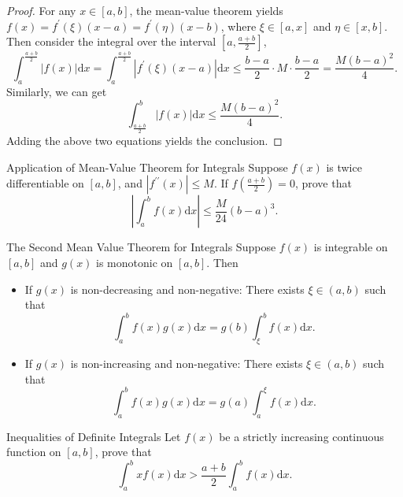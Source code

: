 \begin{proof}
  For any $x \in [a, b]$, the mean-value theorem yields $f(x) =
  f^{\prime}(\xi)(x - a) = f^{\prime}(\eta)(x - b)$,
  where $\xi \in [a, x]$ and $\eta \in [x, b]$.
  Then consider the integral over the interval $[a, \frac{a+b}{2}]$,
  \begin{equation}
    \int_a^{\frac{a+b}{2}} |f(x)| \mathrm{d} x
    = \int_a^{\frac{a+b}{2}} |f^{\prime}(\xi) (x - a)| \mathrm{d} x
    \leq \frac{b-a}{2} \cdot M \cdot \frac{b-a}{2} = \frac{M(b-a)^2}{4}.
  \end{equation}
  Similarly, we can get
  \begin{equation}
    \int_{\frac{a+b}{2}}^b |f(x)|\mathrm{d} x \leq \frac{M(b-a)^2}{4}.
  \end{equation}
  Adding the above two equations yields the conclusion.
\end{proof}

\begin{example}{Application of Mean-Value Theorem for Integrals}{}
  Suppose $f(x)$ is twice differentiable on $[a, b]$,
  and $|f^{\prime\prime}(x)| \leq M$.
  If $f(\frac{a+b}{2}) = 0$, prove that
  \begin{equation}
    \left| \int_a^b f(x)\mathrm{d} x \right| \leq \frac{M}{24}(b - a)^3.
  \end{equation}
\end{example}

\begin{theorem}{The Second Mean Value Theorem for Integrals}{}
  Suppose $f(x)$ is integrable on $[a, b]$ and $g(x)$ is monotonic on $[a, b]$.
  Then 
  \begin{itemize}
  \item If $g(x)$ is non-decreasing and non-negative: There exists $\xi \in (a,
    b)$ such that
    \begin{equation}
      \int_a^b f(x) g(x) \mathrm{d} x = g(b) \int_{\xi}^b f(x) \mathrm{d} x.
    \end{equation}
  \item If $g(x)$ is non-increasing and non-negative: There exists $\xi \in (a,
    b)$ such that
    \begin{equation}
      \int_a^b f(x) g(x) \mathrm{d} x = g(a) \int_{a}^{\xi} f(x) \mathrm{d} x.
    \end{equation}
  \end{itemize}
\end{theorem}

\begin{example}{Inequalities of Definite Integrals}{}
  Let $f(x)$ be a strictly increasing continuous function on $[a, b]$,
  prove that
  \begin{equation}
    \int _a^b x f(x)\mathrm{d} x > \frac{a+b}{2} \int_a^b f(x)\mathrm{d} x.
  \end{equation}
\end{example}

